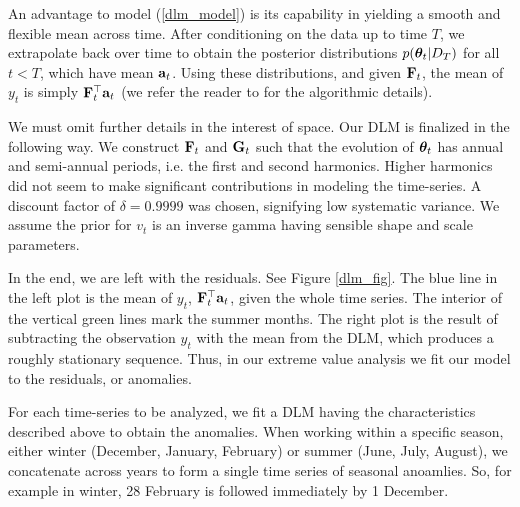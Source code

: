 An advantage to model (\ref{dlm_model}) is its capability in yielding a smooth and flexible mean across time. After conditioning on the data up to time $T$, we extrapolate back over time to obtain the posterior distributions $p(\mathbf{\bm{\theta}}_t|D_T)$ for all $t<T$, which have mean $\mathbf{\bm{a}}_t$. Using these distributions, and given $\mathbf{\bm{F}}_t$, the mean of $y_t$ is simply $\mathbf{\bm{F}}_t^\top\mathbf{\bm{a}}_t$ (we refer the reader to \cite{prado2010time} for the algorithmic details).

We must omit further details in the interest of space. Our DLM is finalized in the following way. We construct $\mathbf{\bm{F}}_t$ and $\mathbf{\bm{G}}_t$ such that the evolution of $\mathbf{\bm{\theta}}_t$ has annual and semi-annual periods, i.e. the first and second harmonics. Higher harmonics did not seem to make significant contributions in modeling the time-series. A discount factor of $\delta=0.9999$ was chosen, signifying low systematic variance. We assume the prior for $v_t$ is an inverse gamma having sensible shape and scale parameters.

In the end, we are left with the residuals. See Figure \ref{dlm_fig}. The blue line in the left plot is the mean of $y_t$, $\mathbf{\bm{F}}_t^\top\mathbf{\bm{a}}_t$, given the whole time series. The interior of the vertical green lines mark the summer months. The right plot is the result of subtracting the observation $y_t$ with the mean from the DLM, which produces a roughly stationary sequence. Thus, in our extreme value analysis we fit our model to the residuals, or anomalies.

For each time-series to be analyzed, we fit a DLM having the characteristics described above to obtain the anomalies. When working within a specific season, either winter (December, January, February) or summer (June, July, August), we concatenate across years to form a single time series of seasonal anoamlies. So, for example in winter, 28 February is followed immediately by 1 December.
